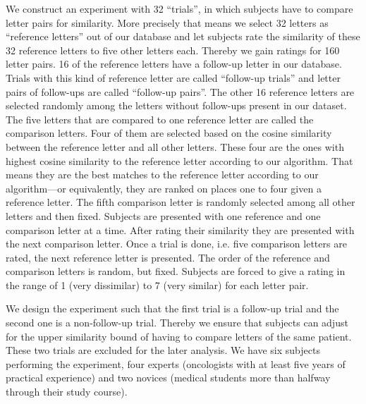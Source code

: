 We construct an experiment with 32 ``trials'', in which subjects have to compare letter pairs for similarity. More precisely that means we select 32 letters as ``reference letters'' out of our database and let subjects rate the similarity of these 32 reference letters to five other letters each. Thereby we gain ratings for 160 letter pairs. 16 of the reference letters have a follow-up letter in our database. Trials with this kind of reference letter are called ``follow-up trials'' and letter pairs of follow-ups are called ``follow-up pairs''. The other 16 reference letters are selected randomly among the letters without follow-ups present in our dataset. The five letters that are compared to one reference letter are called the comparison letters. Four of them are selected based on the cosine similarity between the reference letter and all other letters. These four are the ones with highest cosine similarity to the reference letter according to our algorithm. That means they are the best matches to the reference letter according to our algorithm---or equivalently, they are ranked on places one to four given a reference letter. The fifth comparison letter is randomly selected among all other letters and then fixed. Subjects are presented with one reference and one comparison letter at a time. After rating their similarity they are presented with the next comparison letter. Once a trial is done, i.e. five comparison letters are rated, the next reference letter is presented. The order of the reference and comparison letters is random, but fixed. Subjects are forced to give a rating in the range of 1 (very dissimilar) to 7 (very similar) for each letter pair.%

We design the experiment such that the first trial is a follow-up trial and the second one is a non-follow-up trial. Thereby we ensure that subjects can adjust for the upper similarity bound of having to compare letters of the same patient. These two trials are excluded for the later analysis. We have six subjects performing the experiment, four experts (oncologists with at least five years of practical experience) and two novices (medical students more than halfway through their study course).





